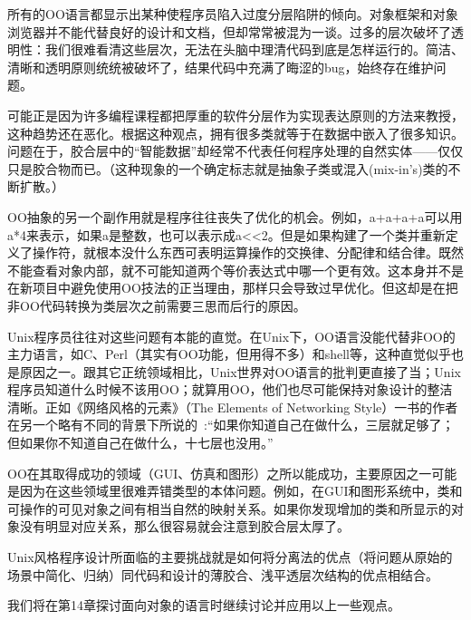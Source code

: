 \documentclass[12pt,oneside]{ctexbook}
\begin{document}
\begin{common-format}
所有的OO语言都显示出某种使程序员陷入过度分层陷阱的倾向。对象框架和对象浏览器并不能代替良好的设计和文档，但却常常被混为一谈。过多的层次破坏了透明性：我们很难看清这些层次，无法在头脑中理清代码到底是怎样运行的。简洁、清晰和透明原则统统被破坏了，结果代码中充满了晦涩的bug，始终存在维护问题。

可能正是因为许多编程课程都把厚重的软件分层作为实现表达原则的方法来教授，这种趋势还在恶化。根据这种观点，拥有很多类就等于在数据中嵌入了很多知识。问题在于，胶合层中的“智能数据”却经常不代表任何程序处理的自然实体——仅仅只是胶合物而已。（这种现象的一个确定标志就是抽象子类或混入(mix-in's)类的不断扩散。）

OO抽象的另一个副作用就是程序往往丧失了优化的机会。例如，a+a+a+a可以用a*4来表示，如果a是整数，也可以表示成a<<2。但是如果构建了一个类并重新定义了操作符，就根本没什么东西可表明运算操作的交换律、分配律和结合律。既然不能查看对象内部，就不可能知道两个等价表达式中哪一个更有效。这本身并不是在新项目中避免使用OO技法的正当理由，那样只会导致过早优化。但这却是在把非OO代码转换为类层次之前需要三思而后行的原因。

Unix程序员往往对这些问题有本能的直觉。在Unix下，OO语言没能代替非OO的主力语言，如C、Perl（其实有OO功能，但用得不多）和shell等，这种直觉似乎也是原因之一。跟其它正统领域相比，Unix世界对OO语言的批判更直接了当；Unix程序员知道什么时候不该用OO；就算用OO，他们也尽可能保持对象设计的整洁清晰。正如《网络风格的元素》（The Elements of Networking Style）一书的作者在另一个略有不同的背景下所说的~\cite{Padlipsky}:“如果你知道自己在做什么，三层就足够了；但如果你不知道自己在做什么，十七层也没用。”

OO在其取得成功的领域（GUI、仿真和图形）之所以能成功，主要原因之一可能是因为在这些领域里很难弄错类型的本体问题。例如，在GUI和图形系统中，类和可操作的可见对象之间有相当自然的映射关系。如果你发现增加的类和所显示的对象没有明显对应关系，那么很容易就会注意到胶合层太厚了。

Unix风格程序设计所面临的主要挑战就是如何将分离法的优点（将问题从原始的场景中简化、归纳）同代码和设计的薄胶合、浅平透层次结构的优点相结合。

我们将在第14章探讨面向对象的语言时继续讨论并应用以上一些观点。



\end{common-format}
\end{document}
